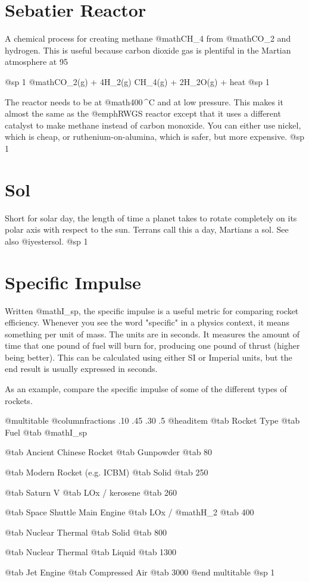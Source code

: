 \section{Sebatier Reactor}
A chemical process for creating methane @math{CH_4} from @math{CO_2} and hydrogen. This is useful because carbon dioxide gas is plentiful in the Martian atmosphere at 95 %

@sp 1
@math{CO_2(g) + 4H_2(g) \rightarrow CH_4(g) + 2H_2O(g) + heat}
@sp 1

The reactor needs to be at @math{400\,^{\circ}{\rm C}} and at low pressure. This makes it almost the same as the @emph{RWGS reactor} except that it uses a different catalyst to make methane instead of carbon monoxide. You can either use nickel, which is cheap, or ruthenium-on-alumina, which is safer, but more expensive.
@sp 1

\section{Sol}
Short for solar day, the length of time a planet takes to rotate completely on its polar axis with respect to the sun. Terrans call this a day, Martians a sol. See also @i{yestersol}.
@sp 1

\section{Specific Impulse}
Written @math{I_{sp}}, the specific impulse is a useful metric for comparing rocket efficiency. Whenever you see the word "specific" in a physics context, it means something per unit of mass. The units are in seconds. It measures the amount of time that one pound of fuel will burn for, producing one pound of thrust (higher being better). This can be calculated using either SI or Imperial units, but the end result is usually expressed in seconds. 

As an example, compare the specific impulse of some of the different types of rockets.

@multitable @columnfractions .10 .45 .30 .5
@headitem @tab Rocket Type @tab Fuel @tab @math{I_{sp}}

\item
@tab Ancient Chinese Rocket
@tab Gunpowder
@tab 80
\item
@tab Modern Rocket (e.g. ICBM)
@tab Solid
@tab 250
\item
@tab Saturn V
@tab LOx / kerosene
@tab 260
\item
@tab Space Shuttle Main Engine
@tab LOx / @math{H_2}
@tab 400
\item
@tab Nuclear Thermal
@tab Solid
@tab 800
\item
@tab Nuclear Thermal 
@tab Liquid
@tab 1300
\item
@tab Jet Engine 
@tab Compressed Air
@tab 3000
@end multitable
@sp 1

